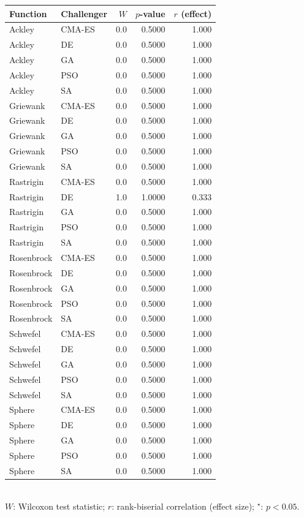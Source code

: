 \begin{table}[htb]
\medskip
\begin{tabular}{llrrr}
\toprule
Function & Challenger & $W$ & $p$-value & $r$ (effect) \\
\midrule
  Ackley & CMA-ES & 0.0 & 0.5000 & 1.000 \\
  Ackley & DE & 0.0 & 0.5000 & 1.000 \\
  Ackley & GA & 0.0 & 0.5000 & 1.000 \\
  Ackley & PSO & 0.0 & 0.5000 & 1.000 \\
  Ackley & SA & 0.0 & 0.5000 & 1.000 \\
  Griewank & CMA-ES & 0.0 & 0.5000 & 1.000 \\
  Griewank & DE & 0.0 & 0.5000 & 1.000 \\
  Griewank & GA & 0.0 & 0.5000 & 1.000 \\
  Griewank & PSO & 0.0 & 0.5000 & 1.000 \\
  Griewank & SA & 0.0 & 0.5000 & 1.000 \\
  Rastrigin & CMA-ES & 0.0 & 0.5000 & 1.000 \\
  Rastrigin & DE & 1.0 & 1.0000 & 0.333 \\
  Rastrigin & GA & 0.0 & 0.5000 & 1.000 \\
  Rastrigin & PSO & 0.0 & 0.5000 & 1.000 \\
  Rastrigin & SA & 0.0 & 0.5000 & 1.000 \\
  Rosenbrock & CMA-ES & 0.0 & 0.5000 & 1.000 \\
  Rosenbrock & DE & 0.0 & 0.5000 & 1.000 \\
  Rosenbrock & GA & 0.0 & 0.5000 & 1.000 \\
  Rosenbrock & PSO & 0.0 & 0.5000 & 1.000 \\
  Rosenbrock & SA & 0.0 & 0.5000 & 1.000 \\
  Schwefel & CMA-ES & 0.0 & 0.5000 & 1.000 \\
  Schwefel & DE & 0.0 & 0.5000 & 1.000 \\
  Schwefel & GA & 0.0 & 0.5000 & 1.000 \\
  Schwefel & PSO & 0.0 & 0.5000 & 1.000 \\
  Schwefel & SA & 0.0 & 0.5000 & 1.000 \\
  Sphere & CMA-ES & 0.0 & 0.5000 & 1.000 \\
  Sphere & DE & 0.0 & 0.5000 & 1.000 \\
  Sphere & GA & 0.0 & 0.5000 & 1.000 \\
  Sphere & PSO & 0.0 & 0.5000 & 1.000 \\
  Sphere & SA & 0.0 & 0.5000 & 1.000 \\
\bottomrule
\end{tabular}
\\ \footnotesize{$W$: Wilcoxon test statistic; $r$: rank-biserial correlation (effect size); $^\star$: $p < 0.05$.}
\end{table}